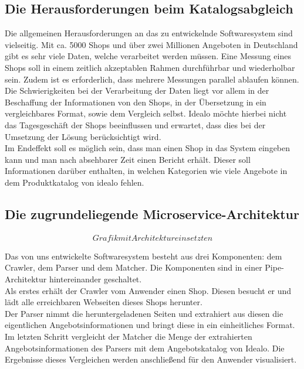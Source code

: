\subsection{Die Herausforderungen beim Katalogsabgleich}

Die allgemeinen Herausforderungen an das zu entwickelnde Softwaresystem sind vielseitig. Mit ca. 5000 Shops und über zwei Millionen Angeboten in Deutschland gibt es sehr viele Daten, welche verarbeitet werden müssen. Eine Messung eines Shops soll in einem zeitlich akzeptablen Rahmen durchführbar und wiederholbar sein. Zudem ist es erforderlich, dass mehrere Messungen parallel ablaufen können.\\
Die Schwierigkeiten bei der Verarbeitung der Daten liegt vor allem in der Beschaffung der Informationen von den Shops, in der Übersetzung in ein vergleichbares Format, sowie dem Vergleich selbst. Idealo möchte hierbei nicht das Tagesgeschäft der Shops beeinflussen und erwartet, dass dies bei der Umsetzung der Lösung berücksichtigt wird.\\
Im Endeffekt soll es möglich sein, dass man einen Shop in das System eingeben kann und man nach absehbarer Zeit einen Bericht erhält. Dieser soll Informationen darüber enthalten, in welchen Kategorien wie viele Angebote in dem Produktkatalog von idealo fehlen.

\subsection{Die zugrundeliegende Microservice-Architektur}

\begin{align}
 Grafik mit Architektur einsetzten
\end{align}

Das von uns entwickelte Softwaresystem besteht aus drei Komponenten: dem Crawler, dem Parser und dem Matcher. Die Komponenten sind in einer Pipe-Architektur hintereinander geschaltet. \\
Als erstes erhält der Crawler vom Anwender einen Shop. Diesen besucht er und lädt alle erreichbaren Webseiten dieses Shops herunter. \\
Der Parser nimmt die heruntergeladenen Seiten und extrahiert aus diesen die eigentlichen Angebotsinformationen und bringt diese in ein einheitliches Format. \\
Im letzten Schritt vergleicht der Matcher die Menge der extrahierten Angebotsinformationen des Parsers mit dem Angebotskatalog von Idealo. Die Ergebnisse dieses Vergleichen werden anschließend für den Anwender visualisiert.

